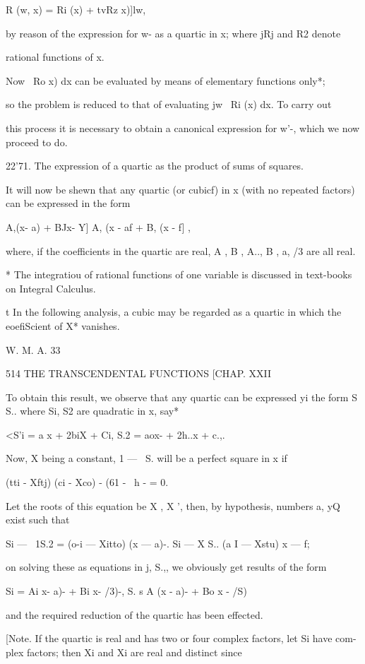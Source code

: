 R (w, x) = Ri (x) + tvRz x)]lw,

by reason of the expression for w- as a quartic in x; where jRj and
R2 denote

rational functions of x.

Now \ Ro x) dx can be evaluated by means of elementary functions
only*;

so the problem is reduced to that of evaluating jw~ Ri (x) dx. To
carry out

this process it is necessary to obtain a canonical expression for w'-,
which we now proceed to do.

22'71. The expression of a quartic as the product of sums of squares.

It will now be shewn that any quartic (or cubicf) in x (with no
repeated factors) can be expressed in the form

 A,(x- a) + BJx- Y] A, (x - af + B, (x - f] ,

where, if the coefficients in the quartic are real, A , B , A.., B ,
a, /3 are all real.

* The integratiou of rational functions of one variable is discussed
in text-books on Integral Calculus.

t In the following analysis, a cubic may be regarded as a quartic in
which the eoefiScient of X* vanishes.

W. M. A. 33

514 THE TRANSCENDENTAL FUNCTIONS [CHAP. XXII

To obtain this result, we observe that any quartic can be expressed yi
the form S S.. where Si, S2 are quadratic in x, say*

<S'i = a x + 2biX + Ci, S.2 = aox- + 2h..x + c.,.

Now, X being a constant, 1 — \ S. will be a perfect square in x if

(tti - Xftj) (ci - Xco) - (61 - \ h - = 0.

Let the roots of this equation be X , X ', then, by hypothesis,
numbers a, yQ exist such that

Si — \ 1S.2 = (o-i — Xitto) (x — a)-. Si — X S.. (a I — Xstu) x — f;

on solving these as equations in j, S.,, we obviously get results of
the form

Si = Ai x- a)- + Bi x- /3)-, S. s A (x - a)- + Bo x - /S)

and the required reduction of the quartic has been effected.

[Note. If the quartic is real and has two or four complex factors, let
Si have com- plex factors; then Xi and Xi are real and distinct since

